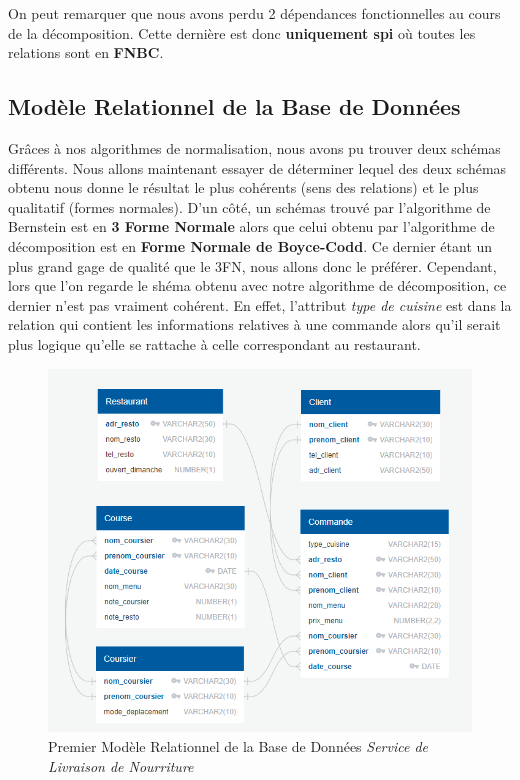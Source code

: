 \documentclass[french]{article}
\begin{document}
            \noindent
            On peut remarquer que nous avons perdu 2 dépendances fonctionnelles au cours de la décomposition. Cette dernière est donc \textbf{uniquement spi} où toutes les relations sont en \textbf{FNBC}.
            
    \subsection*{Modèle Relationnel de la Base de Données}
        Grâces à nos algorithmes de normalisation, nous avons pu trouver deux schémas différents. Nous allons maintenant essayer de déterminer lequel des deux schémas obtenu nous donne le résultat le plus cohérents (sens des relations) et le plus qualitatif (formes normales).\newline
        D'un côté, un schémas trouvé par l'algorithme de Bernstein est en \textbf{3 Forme Normale} alors que celui obtenu par l'algorithme de décomposition est en \textbf{Forme Normale de Boyce-Codd}. Ce dernier étant un plus grand gage de qualité que le 3FN, nous allons donc le préférer.\newline
        Cependant, lors que l'on regarde le shéma obtenu avec notre algorithme de décomposition, ce dernier n'est pas vraiment cohérent. En effet, l'attribut \emph{type de cuisine} est dans la relation qui contient les informations relatives à une commande alors qu'il serait plus logique qu'elle se rattache à celle correspondant au restaurant.\bigskip

        \begin{figure}[ht] %
            \centering
            \includegraphics[scale = 0.7]{Image/modele_relationnel_1.png}
            \caption{Premier Modèle Relationnel de la Base de Données \emph{Service de Livraison de Nourriture}}
            \label{image_modele_relationnel_1}
        \end{figure}
        \newpage
\end{document}
